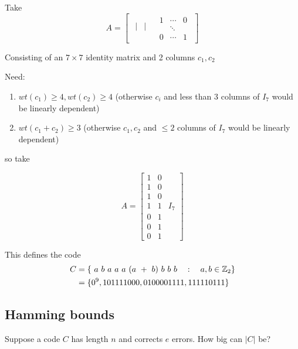 \documentclass[]{article}
\theoremstyle{definition}
\theoremstyle{remark}
\numberwithin{equation}{section}
\begin{document}
			Take
			\begin{equation*}
				A = \begin{bmatrix}
					\begin{matrix}
					| & | & \\
					\end{matrix}

					\begin{matrix}
					1 & \cdots & 0 \\
					  & \ddots & \\
					0 & \cdots & 1
					\end{matrix}
					\end{bmatrix}
			\end{equation*}

			Consisting of an $7 \times 7$ identity matrix and 2 columns $c_1, c_2$

			Need:
			\begin{enumerate}
				\item $wt(c_1)\geq 4, wt(c_2)\geq 4$ (otherwise $c_i$ and less than 3 columns of $I_7$ would be linearly dependent)
				\item $wt(c_1+ c_2) \geq 3$ (otherwise $c_1, c_2$ and $\leq 2$ columns of $I_7$ would be linearly dependent)
			\end{enumerate}
			so take

			\begin{equation*}
				A = \begin{bmatrix}
					1 & 0 \\
					1 & 0 \\
					1 & 0 \\
					1 & 1 & I_7 \\
					0 & 1 \\
					0 & 1 \\
					0 & 1

					\end{bmatrix}
			\end{equation*}

			This defines the code
			\begin{align*}
				C &= \{\ a\ b\ a\ a\ a\ (a\ +\ b)\ b\ b\ b \quad: \quad a,b \in \mathbb{Z}_2 \} \\
				  &= \{0^9, 101111000, 0100001111, 111110111\}
			\end{align*}
	\subsection{Hamming bounds}

		Suppose a code $C$ has length $n$ and corrects $e$ errors. How big can $|C|$ be?\\
\end{document}
